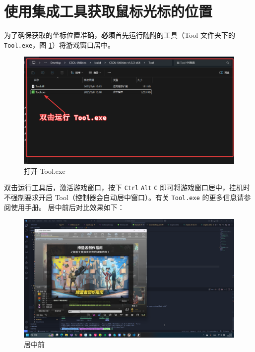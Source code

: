 \section{使用集成工具获取鼠标光标的位置}

为了确保获取的坐标位置准确，\textbf{\color{red}必须}首先运行随附的工具（Tool 文件夹下的 \lstinline{Tool.exe}，图 \ref{ch2fig-run-tool}）将游戏窗口居中。

\begin{figure}[H]
    \Centering
    \includegraphics[width=\textwidth]{assets/run_tool.png}
    \caption{打开 Tool.exe}
    \label{ch2fig-run-tool}
\end{figure}

双击运行工具后，激活游戏窗口，按下 \lstinline{Ctrl} \lstinline{Alt} \lstinline{C} 即可将游戏窗口居中，挂机时不强制要求开启 Tool（控制器会自动居中窗口）。有关 \lstinline{Tool.exe} 的更多信息请参阅使用手册。
居中前后对比效果如下：
    
\begin{figure}[H]
    \Centering
    \includegraphics[width=\textwidth]{assets/before_center.png}
    \caption{居中前}
    \label{ch2fig-before-center}
\end{figure}

